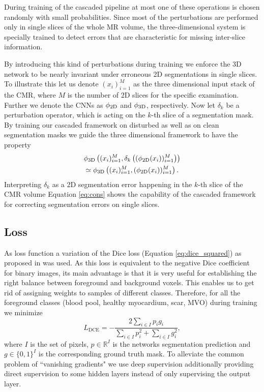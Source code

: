 \documentclass[preprint,5p,authoryear]{elsarticle}
\begin{document}
 During training of the cascaded pipeline at most one of these operations is chosen randomly with small probabilities. Since most of the perturbations are performed only in single slices of the whole MR volume, the three-dimensional system is specially trained to detect errors that are characteristic for missing inter-slice information. 

 By introducing this kind of perturbations during training we enforce the 3D network to be nearly invariant under erroneous 2D segmentations in single slices. To illustrate this let us denote $(x_i)_{i=1}^M$ as the three dimensional input stack of the CMR, where $M$ is the number of 2D slices for the specific examination. Further we denote the CNNs as $\phi_{\rm 2D}$ and $ \phi_{\rm 3D}$, respectively. Now let $\delta_k$ be a perturbation operator, which is acting on the $k$-th slice of a segmentation mask. By training our cascaded framework on disturbed as well as on clean segmentation masks we guide the three dimensional framework to have the property
\begin{multline}
   \label{eq:cons}
     \phi_{\rm 3D} \left( (x_i)_{i=1}^M, \delta_k \left((\phi_{\rm 2D}(x_i))_{i=1}^M \right) \right) \\
     \simeq \phi_{\rm 3D} \left( (x_i)_{i=1}^M, (\phi_{\rm 2D}(x_i))_{i=1}^M \right).   
\end{multline}
Interpreting $\delta_k$ as a 2D segmentation error happening in the $k$-th slice of the CMR volume Equation \ref{eq:cons} shows the capability of the cascaded framework for correcting segmentation errors on single slices. 

\subsection{Loss}
As loss function a variation of the Dice loss (Equation \ref{eq:dice_squared}) as proposed in \cite{milletari2016v} was used. As this loss is equivalent to the negative Dice coefficient for binary images, its main advantage is that it is very useful for establishing the right balance between foreground and background voxels. This enables us to get rid of assigning weights to samples of different classes. Therefore, for all the foreground classes (blood pool, healthy myocardium, scar, MVO) during training we minimize 
\begin{equation}
    \label{eq:dice_squared}
    L_\mathrm{DCE} = - \frac{2 \sum_{i\in I} p_i g_i}{\sum_{i\in I} p_i^2+\sum_{i\in I}  g_i^2}, 
\end{equation}
where $I$ is the set of pixels, $p \in \mathbb{R}^I$ is the networks segmentation prediction and $g \in \{0,1\}^I$ is the corresponding ground truth mask. To alleviate the common problem of ``vanishing gradients" we use deep supervision \citep{lee2015deeply} additionally providing direct supervision to some hidden layers instead of only supervising the output layer. 
\end{document}
